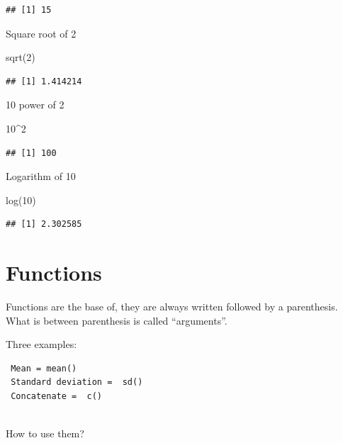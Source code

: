 \documentclass[
]{book}
\newenvironment{Shaded}{\begin{snugshade}}{\end{snugshade}}
\newcommand{\DecValTok}[1]{\textcolor[rgb]{0.00,0.00,0.81}{#1}}
\newcommand{\FunctionTok}[1]{\textcolor[rgb]{0.00,0.00,0.00}{#1}}
\newcommand{\NormalTok}[1]{#1}
\newcommand{\SpecialCharTok}[1]{\textcolor[rgb]{0.00,0.00,0.00}{#1}}
\begin{document}
\begin{verbatim}
## [1] 15
\end{verbatim}

Square root of 2

\begin{Shaded}
\begin{Highlighting}[]
\FunctionTok{sqrt}\NormalTok{(}\DecValTok{2}\NormalTok{)}
\end{Highlighting}
\end{Shaded}

\begin{verbatim}
## [1] 1.414214
\end{verbatim}

10 power of 2

\begin{Shaded}
\begin{Highlighting}[]
\DecValTok{10}\SpecialCharTok{\^{}}\DecValTok{2}
\end{Highlighting}
\end{Shaded}

\begin{verbatim}
## [1] 100
\end{verbatim}

Logarithm of 10

\begin{Shaded}
\begin{Highlighting}[]
\FunctionTok{log}\NormalTok{(}\DecValTok{10}\NormalTok{)}
\end{Highlighting}
\end{Shaded}

\begin{verbatim}
## [1] 2.302585
\end{verbatim}

\hypertarget{functions}{%
\section{Functions}\label{functions}}

Functions are the base of, they are always written followed by a parenthesis.
What is between parenthesis is called ``arguments''.

Three examples:

\begin{verbatim}
 Mean = mean()
 Standard deviation =  sd()
 Concatenate =  c()   
 
\end{verbatim}

How to use them?
\end{document}
